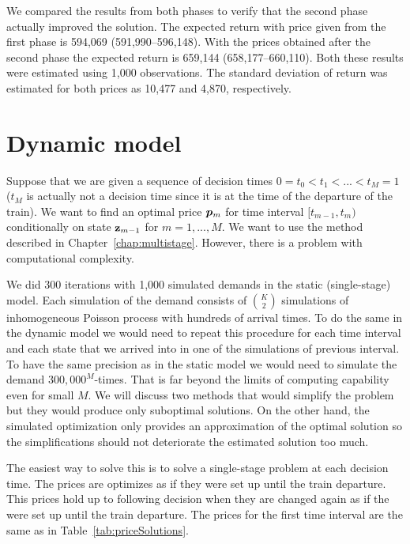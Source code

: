 We compared the results from both phases to verify that the second phase actually improved the solution. The expected return with price given from the first phase is 594,069 (591,990--596,148). With the prices obtained after the second phase the expected return is 659,144 (658,177--660,110). Both these results were estimated using 1,000 observations. The standard deviation of return was estimated for both prices as 10,477 and 4,870, respectively.




\section{Dynamic model}
	\label{chap:dynamicModel}

Suppose that we are given a sequence of decision times $0 = t_0 < t_1 < ... < t_M = 1$ ($t_M$ is actually not a decision time since it is at the time of the departure of the train). We want to find an optimal price $\bm{p}_m$ for time interval $[t_{m-1} , t_{m})$ conditionally on state $\operatorname{\mathbf{z}}_{m-1}$ for $m = 1, ..., M$. We want to use the method described in Chapter~\ref{chap:multistage}. However, there is a problem with computational complexity.

We did 300 iterations with 1,000 simulated demands in the static (single-stage) model. Each simulation of the demand consists of $\binom{K}{2}$ simulations of inhomogeneous Poisson process with hundreds of arrival times. To do the same in the dynamic model we would need to repeat this procedure for each time interval and each state that we arrived into in one of the simulations of previous interval. To have the same precision as in the static model we would need to simulate the demand $300,000^M$-times. That is far beyond the limits of computing capability even for small $M$. We will discuss two methods that would simplify the problem but they would produce only suboptimal solutions. On the other hand, the simulated optimization only provides an approximation of the optimal solution so the simplifications should not deteriorate the estimated solution too much.

The easiest way to solve this is to solve a single-stage problem at each decision time. The prices are optimizes as if they were set up until the train departure. This prices hold up to following decision when they are changed again as if the were set up until the train departure. The prices for the first time interval are the same as in Table~\ref{tab:priceSolutions}.

